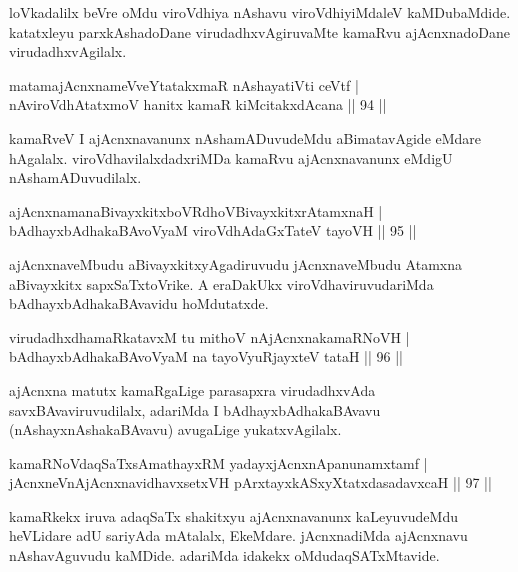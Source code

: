 \begin{artha}
loVkadalilx beVre oMdu viroVdhiya nAshavu viroVdhiyiMdaleV kaMDubaMdide. katatxleyu parxkAshadoDane virudadhxvAgiruvaMte kamaRvu ajAcnxnadoDane virudadhxvAgilalx.
\end{artha}

\begin{shl}
matamajAcnxnameVveYtatakxmaR nAshayatiVti ceVtf |\\
nAviroVdhAtatxmoV hanitx kamaR kiMcitakxdAcana \hfill || 94 ||
\end{shl}

\begin{artha}
kamaRveV I ajAcnxnavanunx nAshamADuvudeMdu aBimatavAgide eMdare hAgalalx. viroVdhavilalxdadxriMDa kamaRvu ajAcnxnavanunx eMdigU nAshamADuvudilalx.
\end{artha}

\begin{shl}
ajAcnxnamanaBivayxkitxboVRdhoV\s BivayxkitxrAtamxnaH |\\
bAdhayxbAdhakaBAvoV\s yaM viroVdhAdaGxTateV tayoVH \hfill || 95 ||
\end{shl}

\begin{artha}
ajAcnxnaveMbudu aBivayxkitxyAgadiruvudu jAcnxnaveMbudu Atamxna aBivayxkitx sapxSaTxtoVrike. A eraDakUkx viroVdhaviruvudariMda bAdhayxbAdhakaBAvavidu hoMdutatxde.
\end{artha}

\begin{shl}
virudadhxdhamaRkatavxM tu mithoV nAjAcnxnakamaRNoVH |\\
bAdhayxbAdhakaBAvoV\s yaM na tayoVyuRjayxteV tataH \hfill || 96 ||
\end{shl}

\begin{artha}
ajAcnxna matutx kamaRgaLige parasapxra virudadhxvAda savxBAvaviruvudilalx, adariMda I bAdhayxbAdhakaBAvavu (nAshayxnAshakaBAvavu) avugaLige yukatxvAgilalx.
\end{artha}

\begin{shl}
kamaRNoV\s daqSaTxsAmathayxRM yadayxjAcnxnApanunamxtamf |\\
jAcnxneVnAjAcnxnavidhavxsetxVH pArxtayxkASxyXtatxdasadavxcaH \hfill || 97 ||
\end{shl}

\begin{artha}
kamaRkekx iruva adaqSaTx shakitxyu ajAcnxnavanunx kaLeyuvudeMdu heVLidare adU sariyAda mAtalalx, EkeMdare. jAcnxnadiMda ajAcnxnavu nAshavAguvudu kaMDide. adariMda idakekx oMdudaqSATxMtavide.
\end{artha}

